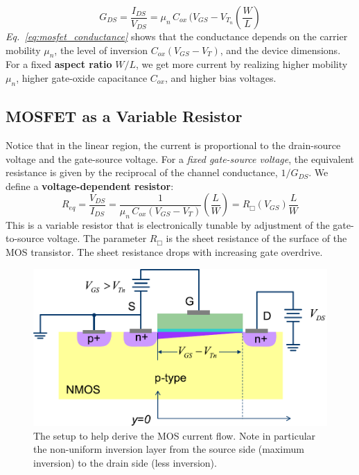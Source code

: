     \begin{equation}
        G_{DS} = \frac{I_{DS}}{V_{DS}} = {\mu_n\,C_{ox}\,(V_{GS} - V_{T_n}} \left( \frac{W}{L} \right)
        \label{eq:mosfet_conductance}
    \end{equation}
\emph{Eq.~\ref{eq:mosfet_conductance}} shows that the conductance depends on the carrier mobility $\mu_n$, the level of inversion $C_{ox}(V_{GS}-V_T)$, and the device dimensions. For a fixed \textbf{aspect ratio} $W/L$, we get more current by realizing higher mobility $\mu_n$, higher gate-oxide capacitance $C_{ox}$, and higher bias voltages.  
\subsection{MOSFET as a Variable Resistor}
Notice that in the linear region, the current is proportional to the drain-source voltage and the gate-source voltage.  For a \textit{fixed gate-source voltage}, the equivalent resistance is given by the reciprocal of the channel conductance, $1/G_{DS}$.  We define a \textbf{voltage-dependent resistor}:
    \begin{equation}
        R_{eq} = \frac{V_{DS}}{I_{DS}} = \frac{1}{\mu_n\,C_{ox}(V_{GS} - V_T)} \left( {\frac{L}{W}} \right)
        = R_\Box(V_{GS})\frac{L}{W}
    \end{equation}
This is a variable resistor that is electronically tunable by adjustment of the gate-to-source voltage.  The parameter $R_\Box$ is the sheet resistance of the surface of the MOS transistor.  The sheet resistance drops with increasing gate overdrive.
\newpage
\begin{figure}[t]
\centering
\includegraphics[width=.85\columnwidth]{mos_current_derive}
\caption{The setup to help derive the MOS current flow.  Note in particular the non-uniform inversion layer from the source side (maximum inversion) to the drain side (less inversion).}
\label{fig:mos_current_derive}
\end{figure}
